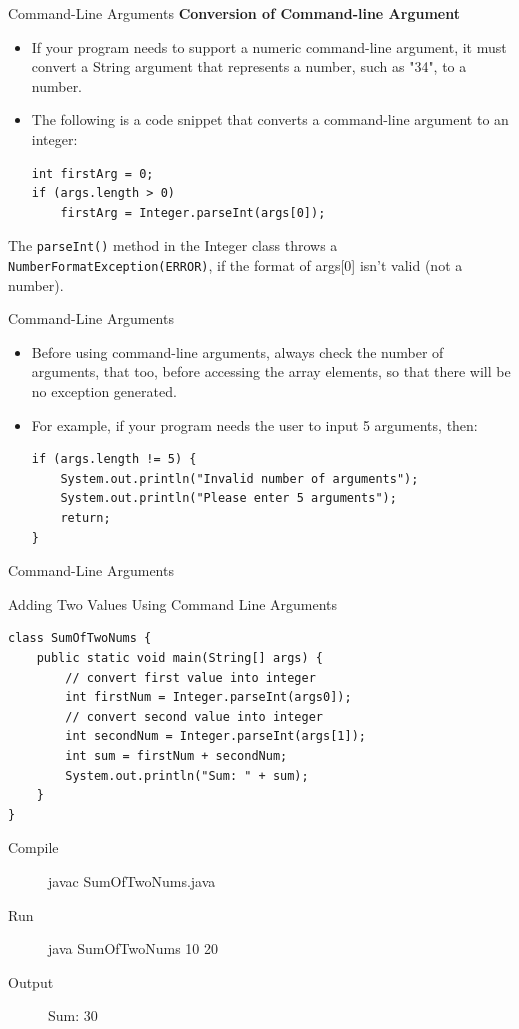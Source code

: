 \documentclass[12pt]{beamer}
\begin{document}
\begin{frame}[fragile]{Command-Line Arguments}
 \textbf{Conversion of Command-line Argument}
 \begin{itemize}
  \item If your program needs to support a numeric command-line argument, it must convert a String argument that represents a number, such as "34", to a number.
  \item The following is a code snippet that converts a command-line argument to an integer:
   \begin{lstlisting}[numbers=none]
int firstArg = 0;
if (args.length > 0)
    firstArg = Integer.parseInt(args[0]);
   \end{lstlisting}
 \end{itemize}
 The \lstinline!parseInt()! method in the Integer class throws a \lstinline!NumberFormatException(ERROR)!, if the format of args[0] isn't valid  (not a number).
\end{frame}

\begin{frame}[fragile]{Command-Line Arguments}
 \begin{itemize}
  \item Before using command-line arguments, always check the number of arguments, that too, before accessing the array elements, so that there will be no exception generated.
  \item For example, if your program needs the user to input 5 arguments, then:
  \begin{lstlisting}[numbers=none]
if (args.length != 5) {
    System.out.println("Invalid number of arguments");
    System.out.println("Please enter 5 arguments");
    return;
}
  \end{lstlisting}
 \end{itemize}
\end{frame}

\begin{frame}[fragile]{Command-Line Arguments}
 \begin{block}{Adding Two Values Using Command Line Arguments}
 \begin{lstlisting}[numbers=none]
class SumOfTwoNums {
    public static void main(String[] args) {
        // convert first value into integer
        int firstNum = Integer.parseInt(args0]);		
        // convert second value into integer 
        int secondNum = Integer.parseInt(args[1]);
        int sum = firstNum + secondNum;
        System.out.println("Sum: " + sum);
    }
}
 \end{lstlisting}
 \end{block}
\begin{description}
 \item [Compile] javac SumOfTwoNums.java
 \item [Run] java  SumOfTwoNums 10 20
 \item [Output] Sum: 30
\end{description}
\end{frame}
\end{document}
